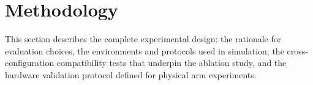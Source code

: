 \documentclass[conference]{IEEEtran}
\begin{document}
%			
%			
%			
%			
%			
%		
		
		
	
	
	\section{Methodology}
	
	This section describes the complete experimental design: the
	rationale for evaluation choices, the environments and protocols
	used in simulation, the cross-configuration compatibility tests
	that underpin the ablation study, and the hardware validation
	protocol defined for physical arm experiments.
	
\end{document}
